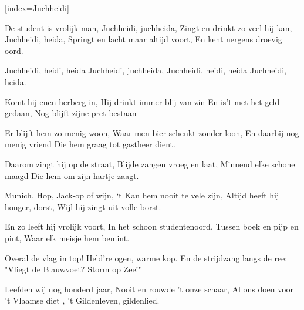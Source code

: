 [index={Juchheidi}]

\beginverse
De student is vrolijk man,
Juchheidi, juchheida,
Zingt en drinkt zo veel hij kan,
Juchheidi, heida,
Springt en lacht maar altijd voort,
En kent nergens droevig oord.
\endverse

\beginchorus
Juchheidi, heidi, heida
Juchheidi, juchheida,
Juchheidi, heidi, heida
Juchheidi, heida.
\endchorus

\beginverse
Komt hij enen herberg in,
Hij drinkt immer blij van zin
En is't met het geld gedaan,
Nog blijft zijne pret bestaan
\endverse

\beginverse
Er blijft hem zo menig woon,
Waar men bier schenkt zonder loon,
En daarbij nog menig vriend
Die hem graag tot gastheer dient.
\endverse

\beginverse
Daarom zingt hij op de straat,
Blijde zangen vroeg en laat,
Minnend elke schone maagd
Die hem om zijn hartje zaagt.
\endverse

\beginverse
Munich, Hop, Jack-op of wijn,
‘t Kan hem nooit te vele zijn,
Altijd heeft hij honger, dorst,
Wijl hij zingt uit volle borst.
\endverse

\beginverse
En zo leeft hij vrolijk voort,
In het schoon studentenoord,
Tussen boek en pijp en pint,
Waar elk meisje hem bemint.
\endverse

\beginverse
Overal de vlag in top!
Held're ogen, warme kop.
En de strijdzang langs de ree:
"Vliegt de Blauwvoet? Storm op Zee!"
\endverse

\beginverse
Leefden wij nog honderd jaar,
Nooit en rouwde 't onze schaar,
Al ons doen voor 't Vlaamse diet ,
't Gildenleven, gildenlied. 
\endverse

\endsong